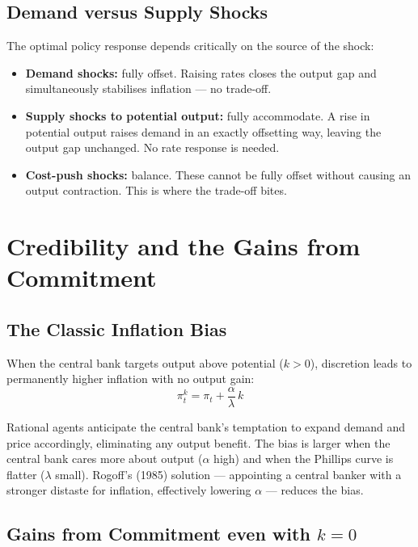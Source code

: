 \documentclass[11pt, a4paper]{article}
\begin{document}
\subsection*{Demand versus Supply Shocks}

The optimal policy response depends critically on the source of the shock:
\begin{itemize}[noitemsep]
    \item \textbf{Demand shocks:} fully offset. Raising rates closes the
          output gap and simultaneously stabilises inflation --- no trade-off.
    \item \textbf{Supply shocks to potential output:} fully accommodate.
          A rise in potential output raises demand in an exactly offsetting
          way, leaving the output gap unchanged. No rate response is needed.
    \item \textbf{Cost-push shocks:} balance. These cannot be fully offset
          without causing an output contraction. This is where the trade-off
          bites.
\end{itemize}

\section{Credibility and the Gains from Commitment}

\subsection*{The Classic Inflation Bias}

When the central bank targets output above potential ($k > 0$), discretion
leads to permanently higher inflation with no output gain:
\begin{equation}
    \pi_t^k = \pi_t + \frac{\alpha}{\lambda}\,k
\end{equation}

Rational agents anticipate the central bank's temptation to expand demand
and price accordingly, eliminating any output benefit. The bias is larger
when the central bank cares more about output ($\alpha$ high) and when the
Phillips curve is flatter ($\lambda$ small). Rogoff's (1985) solution ---
appointing a central banker with a stronger distaste for inflation,
effectively lowering $\alpha$ --- reduces the bias.

\subsection*{Gains from Commitment even with $k = 0$}
\end{document}
